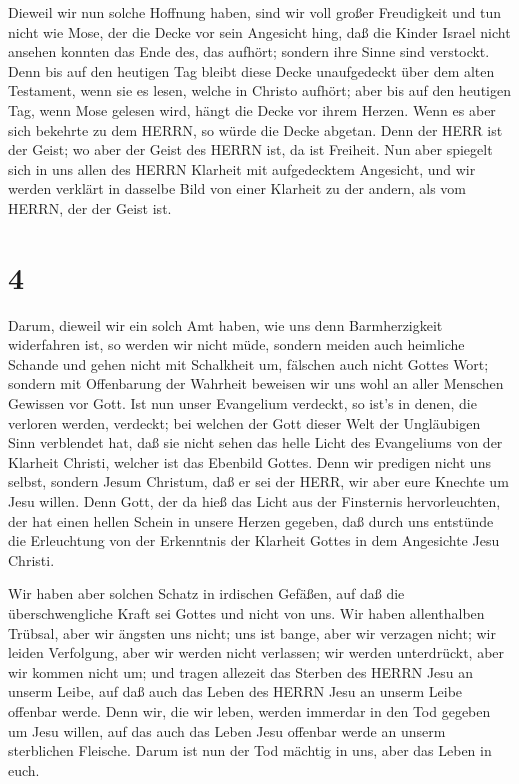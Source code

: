  Dieweil wir nun solche Hoffnung haben, sind wir voll
großer Freudigkeit  und tun nicht wie Mose, der die Decke
vor sein Angesicht hing, daß die Kinder Israel nicht ansehen konnten das
Ende des, das aufhört;  sondern ihre Sinne sind verstockt.
Denn bis auf den heutigen Tag bleibt diese Decke unaufgedeckt über dem
alten Testament, wenn sie es lesen, welche in Christo aufhört;
 aber bis auf den heutigen Tag, wenn Mose gelesen wird,
hängt die Decke vor ihrem Herzen.  Wenn es aber sich
bekehrte zu dem HERRN, so würde die Decke abgetan.  Denn
der HERR ist der Geist; wo aber der Geist des HERRN ist, da ist
Freiheit.  Nun aber spiegelt sich in uns allen des HERRN
Klarheit mit aufgedecktem Angesicht, und wir werden verklärt in dasselbe
Bild von einer Klarheit zu der andern, als vom HERRN, der der Geist ist.

\hypertarget{section-3}{%
\section{4}\label{section-3}}

 Darum, dieweil wir ein solch Amt haben, wie uns denn
Barmherzigkeit widerfahren ist, so werden wir nicht müde, 
sondern meiden auch heimliche Schande und gehen nicht mit Schalkheit um,
fälschen auch nicht Gottes Wort; sondern mit Offenbarung der Wahrheit
beweisen wir uns wohl an aller Menschen Gewissen vor Gott. 
Ist nun unser Evangelium verdeckt, so ist's in denen, die verloren
werden, verdeckt;  bei welchen der Gott dieser Welt der
Ungläubigen Sinn verblendet hat, daß sie nicht sehen das helle Licht des
Evangeliums von der Klarheit Christi, welcher ist das Ebenbild Gottes.
 Denn wir predigen nicht uns selbst, sondern Jesum Christum,
daß er sei der HERR, wir aber eure Knechte um Jesu willen. 
Denn Gott, der da hieß das Licht aus der Finsternis hervorleuchten, der
hat einen hellen Schein in unsere Herzen gegeben, daß durch uns
entstünde die Erleuchtung von der Erkenntnis der Klarheit Gottes in dem
Angesichte Jesu Christi.

 Wir haben aber solchen Schatz in irdischen Gefäßen, auf daß
die überschwengliche Kraft sei Gottes und nicht von uns. 
Wir haben allenthalben Trübsal, aber wir ängsten uns nicht; uns ist
bange, aber wir verzagen nicht;  wir leiden Verfolgung, aber
wir werden nicht verlassen; wir werden unterdrückt, aber wir kommen
nicht um;  und tragen allezeit das Sterben des HERRN Jesu
an unserm Leibe, auf daß auch das Leben des HERRN Jesu an unserm Leibe
offenbar werde.  Denn wir, die wir leben, werden immerdar
in den Tod gegeben um Jesu willen, auf das auch das Leben Jesu offenbar
werde an unserm sterblichen Fleische.  Darum ist nun der
Tod mächtig in uns, aber das Leben in euch.

